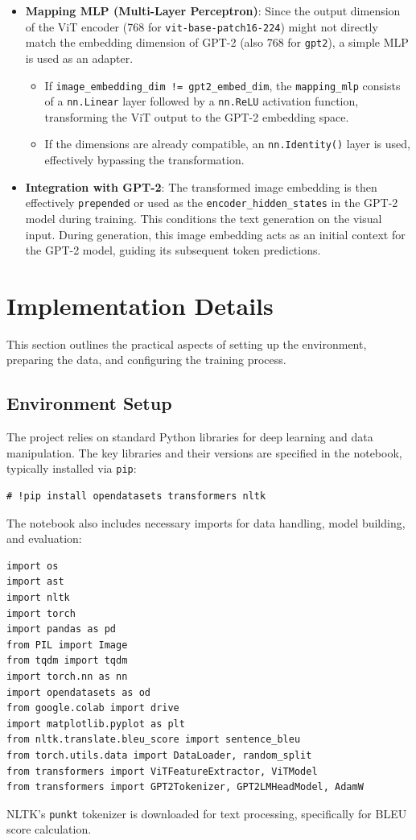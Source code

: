 \documentclass[a4paper, 12pt]{article}
\begin{document}
\begin{itemize}
    \item \textbf{Mapping MLP (Multi-Layer Perceptron)}: Since the output dimension of the ViT encoder (768 for \texttt{vit-base-patch16-224}) might not directly match the embedding dimension of GPT-2 (also 768 for \texttt{gpt2}), a simple MLP is used as an adapter.
        \begin{itemize}
            \item If \texttt{image\_embedding\_dim != gpt2\_embed\_dim}, the \texttt{mapping\_mlp} consists of a \texttt{nn.Linear} layer followed by a \texttt{nn.ReLU} activation function, transforming the ViT output to the GPT-2 embedding space.
            \item If the dimensions are already compatible, an \texttt{nn.Identity()} layer is used, effectively bypassing the transformation.
        \end{itemize}
    \item \textbf{Integration with GPT-2}: The transformed image embedding is then effectively \texttt{prepended} or used as the \texttt{encoder\_hidden\_states} in the GPT-2 model during training. This conditions the text generation on the visual input. During generation, this image embedding acts as an initial context for the GPT-2 model, guiding its subsequent token predictions.
\end{itemize}

\section{Implementation Details}
\label{sec:implementation}

This section outlines the practical aspects of setting up the environment, preparing the data, and configuring the training process.

\subsection{Environment Setup}
The project relies on standard Python libraries for deep learning and data manipulation. The key libraries and their versions are specified in the notebook, typically installed via \texttt{pip}:
\begin{lstlisting}[breaklines=true]
# !pip install opendatasets transformers nltk
\end{lstlisting}
The notebook also includes necessary imports for data handling, model building, and evaluation:
\begin{lstlisting}[breaklines=true]
import os
import ast
import nltk
import torch
import pandas as pd
from PIL import Image
from tqdm import tqdm
import torch.nn as nn
import opendatasets as od
from google.colab import drive
import matplotlib.pyplot as plt
from nltk.translate.bleu_score import sentence_bleu
from torch.utils.data import DataLoader, random_split
from transformers import ViTFeatureExtractor, ViTModel
from transformers import GPT2Tokenizer, GPT2LMHeadModel, AdamW
\end{lstlisting}
NLTK's \texttt{punkt} tokenizer is downloaded for text processing, specifically for BLEU score calculation.
\end{document}
